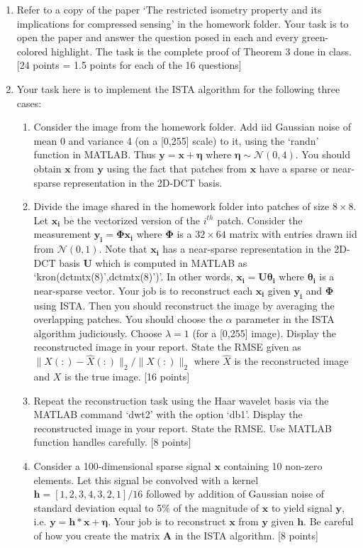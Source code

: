\documentclass[11pt]{article}
\begin{document}
\begin{enumerate}
\item Refer to a copy of the paper `The restricted isometry property and its implications for compressed sensing' in the homework folder. Your task is to open the paper and answer the question posed in each and every green-colored highlight. The task is the complete proof of Theorem 3 done in class. \textsf{[24 points = 1.5 points for each of the 16 questions]}

\item Your task here is to implement the ISTA algorithm for the following three cases:
\begin{enumerate}
\item Consider the image from the homework folder. Add iid Gaussian noise of mean 0 and variance 4 (on a [0,255] scale) to it, using the `randn' function in MATLAB. Thus $\boldsymbol{y} = \boldsymbol{x} + \boldsymbol{\eta}$ where $\boldsymbol{\eta} \sim \mathcal{N}(0,4)$. You should obtain $\boldsymbol{x}$ from $\boldsymbol{y}$ using the fact that patches from $\boldsymbol{x}$ have a sparse or near-sparse representation in the 2D-DCT basis. 
\item Divide the image shared in the homework folder into patches of size $8 \times 8$. Let $\boldsymbol{x_i}$ be the vectorized version of the $i^{th}$ patch. Consider the measurement $\boldsymbol{y_i} = \boldsymbol{\Phi x_i}$ where $\boldsymbol{\Phi}$ is a $32 \times 64$ matrix with entries drawn iid from $\mathcal{N}(0,1)$. Note that $\boldsymbol{x_i}$ has a near-sparse representation in the 2D-DCT basis $\boldsymbol{U}$ which is computed in MATLAB as `kron(dctmtx(8)',dctmtx(8)')'. In other words, $\boldsymbol{x_i} = \boldsymbol{U \theta_i}$ where $\boldsymbol{\theta_i}$ is a near-sparse vector. Your job is to reconstruct each $\boldsymbol{x_i}$ given $\boldsymbol{y_i}$ and $\boldsymbol{\Phi}$ using ISTA. Then you should reconstruct the image by averaging the overlapping patches. You should choose the $\alpha$ parameter in the ISTA algorithm judiciously. Choose $\lambda = 1$ (for a [0,255] image). Display the reconstructed image in your report. State the RMSE given as $\|X(:)-\hat{X}(:)\|_2/\|X(:)\|_2$ where $\hat{X}$ is the reconstructed image and $X$ is the true image. \textsf{[16 points]}
\item Repeat the reconstruction task using the Haar wavelet basis via the MATLAB command `dwt2' with the option `db1'. Display the reconstructed image in your report. State the RMSE. Use MATLAB function handles carefully. \textsf{[8 points]}
\item Consider a 100-dimensional sparse signal $\boldsymbol{x}$ containing 10 non-zero elements. Let this signal be convolved with a kernel $\boldsymbol{h} = [1,2,3,4,3,2,1]/16$ followed by addition of Gaussian noise of standard deviation equal to 5\% of the magnitude of $\boldsymbol{x}$ to yield signal $\boldsymbol{y}$, i.e. $\boldsymbol{y} = \boldsymbol{h}*\boldsymbol{x} + \boldsymbol{\eta}$. Your job is to reconstruct $\boldsymbol{x}$ from $\boldsymbol{y}$ given $\boldsymbol{h}$. Be careful of how you create the matrix $\boldsymbol{A}$ in the ISTA algorithm. \textsf{[8 points]}
\end{enumerate}


\end{enumerate}
\end{document}
